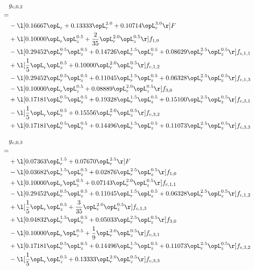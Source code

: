 \begin{alignat}{2} 
\label{eq:g_02_0} 
& g_{c,0,2} \nonumber \\ 
 = \\ 
& - \l[  0.16667 \opL_r +  0.13333 \opL_r^{2.0} +  0.10714 \opL_r^{3.0}  \r] F \nonumber \\ 
& + \l[  0.10000 \opL_r \opL_z^{0.5} + \frac{2}{35} \opL_r^{2.0} \opL_z^{0.5}  \r] f_{1,0} \nonumber \\ 
& - \l[  0.29452 \opL_r^{0.5} \opL_z^{0.5} +  0.14726 \opL_r^{1.5} \opL_z^{0.5} +  0.08629 \opL_r^{2.5} \opL_z^{0.5}  \r] f_{c,1,1} \nonumber \\ 
& + \l[ \frac{1}{5} \opL_r \opL_z^{0.5} +  0.10000 \opL_r^{2.0} \opL_z^{0.5}  \r] f_{c,1,2} \nonumber \\ 
& - \l[  0.29452 \opL_r^{0.5} \opL_z^{0.5} +  0.11045 \opL_r^{1.5} \opL_z^{0.5} +  0.06328 \opL_r^{2.5} \opL_z^{0.5}  \r] f_{c,1,3} \nonumber \\ 
& - \l[  0.10000 \opL_r \opL_z^{0.5} +  0.08889 \opL_r^{2.0} \opL_z^{0.5}  \r] f_{3,0} \nonumber \\ 
& + \l[  0.17181 \opL_r^{0.5} \opL_z^{0.5} +  0.19328 \opL_r^{1.5} \opL_z^{0.5} +  0.15100 \opL_r^{2.5} \opL_z^{0.5}  \r] f_{c,3,1} \nonumber \\ 
& - \l[ \frac{1}{5} \opL_r \opL_z^{0.5} +  0.15556 \opL_r^{2.0} \opL_z^{0.5}  \r] f_{c,3,2} \nonumber \\ 
& + \l[  0.17181 \opL_r^{0.5} \opL_z^{0.5} +  0.14496 \opL_r^{1.5} \opL_z^{0.5} +  0.11073 \opL_r^{2.5} \opL_z^{0.5}  \r] f_{c,3,3} \nonumber \\ 
\end{alignat} 


\begin{alignat}{2} 
\label{eq:g_03_0} 
& g_{c,0,3} \nonumber \\ 
 = \\ 
& + \l[  0.07363 \opL_r^{1.5} +  0.07670 \opL_r^{2.5}  \r] F \nonumber \\ 
& - \l[  0.03682 \opL_r^{1.5} \opL_z^{0.5} +  0.02876 \opL_r^{2.5} \opL_z^{0.5}  \r] f_{1,0} \nonumber \\ 
& + \l[  0.10000 \opL_r \opL_z^{0.5} +  0.07143 \opL_r^{2.0} \opL_z^{0.5}  \r] f_{c,1,1} \nonumber \\ 
& - \l[  0.29452 \opL_r^{0.5} \opL_z^{0.5} +  0.11045 \opL_r^{1.5} \opL_z^{0.5} +  0.06328 \opL_r^{2.5} \opL_z^{0.5}  \r] f_{c,1,2} \nonumber \\ 
& + \l[ \frac{1}{5} \opL_r \opL_z^{0.5} + \frac{3}{35} \opL_r^{2.0} \opL_z^{0.5}  \r] f_{c,1,3} \nonumber \\ 
& + \l[  0.04832 \opL_r^{1.5} \opL_z^{0.5} +  0.05033 \opL_r^{2.5} \opL_z^{0.5}  \r] f_{3,0} \nonumber \\ 
& - \l[  0.10000 \opL_r \opL_z^{0.5} + \frac{1}{9} \opL_r^{2.0} \opL_z^{0.5}  \r] f_{c,3,1} \nonumber \\ 
& + \l[  0.17181 \opL_r^{0.5} \opL_z^{0.5} +  0.14496 \opL_r^{1.5} \opL_z^{0.5} +  0.11073 \opL_r^{2.5} \opL_z^{0.5}  \r] f_{c,3,2} \nonumber \\ 
& - \l[ \frac{1}{5} \opL_r \opL_z^{0.5} +  0.13333 \opL_r^{2.0} \opL_z^{0.5}  \r] f_{c,3,3} \nonumber \\ 
\end{alignat} 


